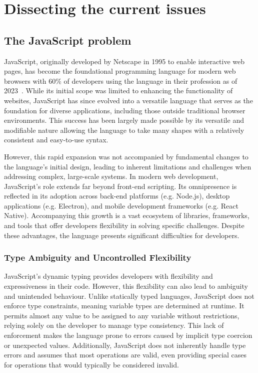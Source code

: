 \section{Dissecting the current issues}

\subsection{The JavaScript problem}

JavaScript, originally developed by Netscape in 1995 to enable interactive web pages, has become the foundational programming language for modern web browsers with 60\% of developers using the language in their profession as of 2023~\cite{jetbrains2023}. While its initial scope was limited to enhancing the functionality of websites, JavaScript has since evolved into a versatile language that serves as the foundation for diverse applications, including those outside traditional browser environments. This success has been largely made possible by its versatile and modifiable nature allowing the language to take many shapes with a relatively consistent and easy-to-use syntax.

However, this rapid expansion was not accompanied by fundamental changes to the language's initial design, leading to inherent limitations and challenges when addressing complex, large-scale systems. In modern web development, JavaScript's role extends far beyond front-end scripting. Its omnipresence is reflected in its adoption across back-end platforms (e.g. Node.js), desktop applications (e.g. Electron), and mobile development frameworks (e.g. React Native). Accompanying this growth is a vast ecosystem of libraries, frameworks, and tools that offer developers flexibility in solving specific challenges. Despite these advantages, the language presents significant difficulties for developers.

\subsubsection{Type Ambiguity and Uncontrolled Flexibility}

JavaScript’s dynamic typing provides developers with flexibility and expressiveness in their code. However, this flexibility can also lead to ambiguity and unintended behaviour. Unlike statically typed languages, JavaScript does not enforce type constraints, meaning variable types are determined at runtime. It permits almost any value to be assigned to any variable without restrictions, relying solely on the developer to manage type consistency. This lack of enforcement makes the language prone to errors caused by implicit type coercion or unexpected values. Additionally, JavaScript does not inherently handle type errors and assumes that most operations are valid, even providing special cases for operations that would typically be considered invalid.

